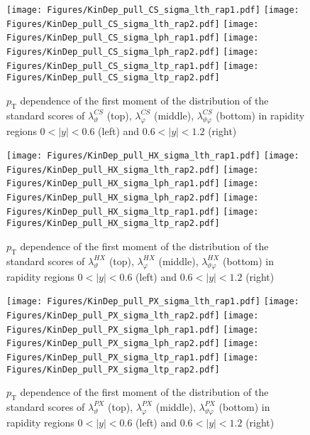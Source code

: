 \documentclass[12pt]{article}
\newcommand{\pT}{p_\mathrm{T}}
\newcommand{\absy}{\left |  y \right |}
\newcommand{\lamthCS}{\lambda^{\scriptscriptstyle CS}_\vartheta}
\newcommand{\lamphCS}{\lambda^{\scriptscriptstyle CS}_\varphi}
\newcommand{\lamthphCS}{\lambda^{\scriptscriptstyle CS}_{\vartheta \varphi}}
\newcommand{\lamthHX}{\lambda^{\scriptscriptstyle HX}_\vartheta}
\newcommand{\lamphHX}{\lambda^{\scriptscriptstyle HX}_\varphi}
\newcommand{\lamthphHX}{\lambda^{\scriptscriptstyle HX}_{\vartheta \varphi}}
\newcommand{\lamthPX}{\lambda^{\scriptscriptstyle PX}_\vartheta}
\newcommand{\lamphPX}{\lambda^{\scriptscriptstyle PX}_\varphi}
\newcommand{\lamthphPX}{\lambda^{\scriptscriptstyle PX}_{\vartheta \varphi}}
\begin{document}
\begin{figure}[htbp]
\centering
\texttt{[image: Figures/KinDep\_pull\_CS\_sigma\_lth\_rap1.pdf]}
\texttt{[image: Figures/KinDep\_pull\_CS\_sigma\_lth\_rap2.pdf]}
\texttt{[image: Figures/KinDep\_pull\_CS\_sigma\_lph\_rap1.pdf]}
\texttt{[image: Figures/KinDep\_pull\_CS\_sigma\_lph\_rap2.pdf]}
\texttt{[image: Figures/KinDep\_pull\_CS\_sigma\_ltp\_rap1.pdf]}
\texttt{[image: Figures/KinDep\_pull\_CS\_sigma\_ltp\_rap2.pdf]}
\caption{$\pT$ dependence of the first moment of the distribution of the
standard scores of $\lamthCS$ (top), $\lamphCS$ (middle), $\lamthphCS$ (bottom)
in rapidity regions $0<\absy<0.6$ (left) and $0.6<\absy<1.2$ (right)}
\end{figure}
\clearpage

\begin{figure}[htbp]
\centering
\texttt{[image: Figures/KinDep\_pull\_HX\_sigma\_lth\_rap1.pdf]}
\texttt{[image: Figures/KinDep\_pull\_HX\_sigma\_lth\_rap2.pdf]}
\texttt{[image: Figures/KinDep\_pull\_HX\_sigma\_lph\_rap1.pdf]}
\texttt{[image: Figures/KinDep\_pull\_HX\_sigma\_lph\_rap2.pdf]}
\texttt{[image: Figures/KinDep\_pull\_HX\_sigma\_ltp\_rap1.pdf]}
\texttt{[image: Figures/KinDep\_pull\_HX\_sigma\_ltp\_rap2.pdf]}
\caption{$\pT$ dependence of the first moment of the distribution of the
standard scores of $\lamthHX$ (top), $\lamphHX$ (middle), $\lamthphHX$ (bottom)
in rapidity regions $0<\absy<0.6$ (left) and $0.6<\absy<1.2$ (right)}
\end{figure}
\clearpage

\begin{figure}[htbp]
\centering
\texttt{[image: Figures/KinDep\_pull\_PX\_sigma\_lth\_rap1.pdf]}
\texttt{[image: Figures/KinDep\_pull\_PX\_sigma\_lth\_rap2.pdf]}
\texttt{[image: Figures/KinDep\_pull\_PX\_sigma\_lph\_rap1.pdf]}
\texttt{[image: Figures/KinDep\_pull\_PX\_sigma\_lph\_rap2.pdf]}
\texttt{[image: Figures/KinDep\_pull\_PX\_sigma\_ltp\_rap1.pdf]}
\texttt{[image: Figures/KinDep\_pull\_PX\_sigma\_ltp\_rap2.pdf]}
\caption{$\pT$ dependence of the first moment of the distribution of the
standard scores of $\lamthPX$ (top), $\lamphPX$ (middle), $\lamthphPX$ (bottom)
in rapidity regions $0<\absy<0.6$ (left) and $0.6<\absy<1.2$ (right)}
\end{figure}
\clearpage
\end{document}
